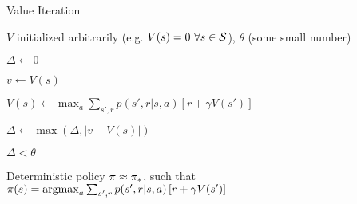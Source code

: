 
\begin{algorithm}
\caption{Value Iteration}
\label{alg:valueiter}

\begin{algorithmic}[0]

	\Require $V$ initialized arbitrarily
		(e.g. $V(s) = 0 \ \forall s \in \States$), %
		$\theta$ (some small number)

	\Repeat

		\State $\Delta \gets 0$


			\State $v \gets V(s)$

			\State $V(s) \gets
				\max_a \sum_{s',r} {
					p(s',r|s,a)\left[ r + \gamma V(s') \right]
				}$

			\State $\Delta \gets \max(\Delta, |v-V(s)|)$

		\EndFor

	\Until $\Delta < \theta$

	\State \Return Deterministic policy $\pi \approx \pi_*$,
		such that \\
		$\pi(s) = \operatorname*{argmax}_a \sum_{s',r} {
					p(s',r|s,a)\left[ r + \gamma V(s') \right]
				}$

\end{algorithmic}

\end{algorithm}

